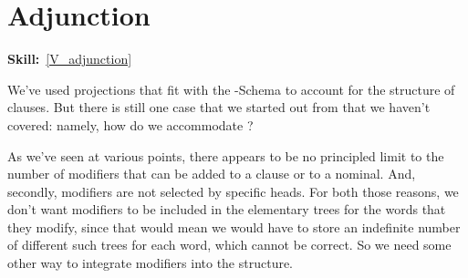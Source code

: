 \documentclass{article}
\begin{document}
\section{Adjunction}
\hfill{}\textbf{Skill:}~\ref{V_adjunction}
 
We've used projections that fit with the -Schema to account for the structure of clauses. %
But there is still one case that we started out from that we haven't covered: namely, how do we accommodate ?

As we've seen at various points, there appears to be no principled limit to the number of modifiers that can be added to a clause or to a nominal.
And, secondly, modifiers are not selected by specific heads.
For both those reasons, we don't want modifiers to be included in the elementary trees for the words that they modify, since that would mean we would have to store an indefinite number of different such trees for each word, which cannot be correct.
So we need some other way to integrate modifiers into the structure.
\end{document}

